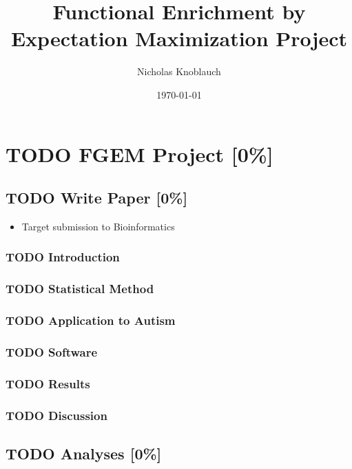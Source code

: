 \documentclass[11pt]{article}
\author{Nicholas Knoblauch}
\date{\today}
\title{Functional Enrichment by Expectation Maximization Project}
\begin{document}
\maketitle
\setcounter{tocdepth}{2}
\tableofcontents


\section*{{\bfseries\sffamily TODO} FGEM Project [0\%]}
\label{sec:org1508fb7}
\subsection*{{\bfseries\sffamily TODO} Write Paper [0\%]}
\label{sec:org732d8ff}
\begin{itemize}
\item Target submission to Bioinformatics
\end{itemize}
\subsubsection*{{\bfseries\sffamily TODO} Introduction}
\label{sec:org9984d46}
\subsubsection*{{\bfseries\sffamily TODO} Statistical Method}
\label{sec:org4643e9f}
\subsubsection*{{\bfseries\sffamily TODO} Application to Autism}
\label{sec:org4440a86}
\subsubsection*{{\bfseries\sffamily TODO} Software}
\label{sec:org7f2702f}
\subsubsection*{{\bfseries\sffamily TODO} Results}
\label{sec:orgae495ef}
\subsubsection*{{\bfseries\sffamily TODO} Discussion}
\label{sec:orgdb2d859}
\subsection*{{\bfseries\sffamily TODO} Analyses [0\%]}
\label{sec:orgf75d1fe}
\end{document}
